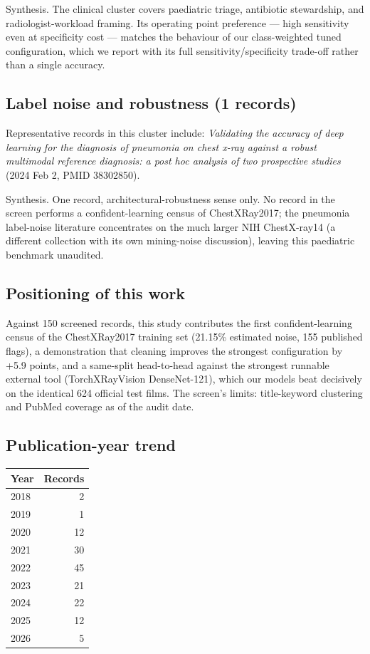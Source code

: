 Synthesis. The clinical cluster covers paediatric triage, antibiotic stewardship, and radiologist-workload framing. Its operating point preference --- high sensitivity even at specificity cost --- matches the behaviour of our class-weighted tuned configuration, which we report with its full sensitivity/specificity trade-off rather than a single accuracy.


\subsection*{Label noise and robustness (1 records)}
Representative records in this cluster include: \emph{Validating the accuracy of deep learning for the diagnosis of pneumonia on chest x-ray against a robust multimodal reference diagnosis: a post hoc analysis of two prospective studies} (2024 Feb 2, PMID 38302850).\par

Synthesis. One record, architectural-robustness sense only. No record in the screen performs a confident-learning census of ChestXRay2017; the pneumonia label-noise literature concentrates on the much larger NIH ChestX-ray14 (a different collection with its own mining-noise discussion), leaving this paediatric benchmark unaudited.


\subsection*{Positioning of this work}
Against 150 screened records, this study contributes the first confident-learning census of the ChestXRay2017 training set (21.15\% estimated noise, 155 published flags), a demonstration that cleaning improves the strongest configuration by +5.9 points, and a same-split head-to-head against the strongest runnable external tool (TorchXRayVision DenseNet-121), which our models beat decisively on the identical 624 official test films. The screen's limits: title-keyword clustering and PubMed coverage as of the audit date.

\subsection*{Publication-year trend}
\begin{tabular}{lr}
\hline
Year & Records \\
\hline
2018 & 2 \\
2019 & 1 \\
2020 & 12 \\
2021 & 30 \\
2022 & 45 \\
2023 & 21 \\
2024 & 22 \\
2025 & 12 \\
2026 & 5 \\
\hline
\end{tabular}

